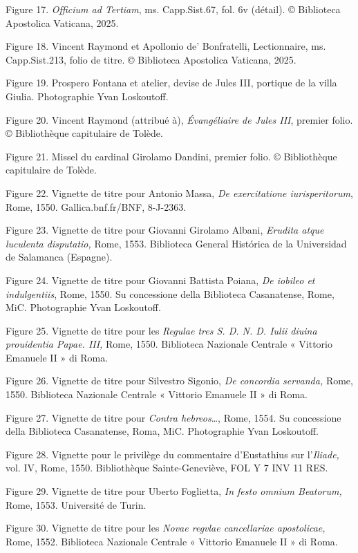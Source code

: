 \documentclass[12pt,twoside,openany]{book}
\begin{document}
Figure 17.\textit{ Officium ad Tertiam}, ms. Capp.Sist.67, fol. 6v (détail). © Biblioteca Apostolica Vaticana, 2025.

Figure 18. Vincent Raymond et Apollonio de’ Bonfratelli, Lectionnaire, ms. Capp.Sist.213, folio de titre. © Biblioteca Apostolica Vaticana, 2025.

Figure 19. Prospero Fontana et atelier, devise de Jules III, portique de la villa Giulia. Photographie Yvan Loskoutoff.

Figure 20. Vincent Raymond (attribué à), \textit{Évangéliaire de Jules III}, premier folio. © Bibliothèque capitulaire de Tolède.

Figure 21. Missel du cardinal Girolamo Dandini, premier folio. © Bibliothèque capitulaire de Tolède.

Figure 22. Vignette de titre pour Antonio Massa,\textit{ De exercitatione iurisperitorum}, Rome, 1550. Gallica.bnf.fr/BNF, 8-J-2363.

Figure 23. Vignette de titre pour Giovanni Girolamo Albani, \textit{Erudita atque luculenta disputatio, }Rome, 1553. Biblioteca General Histórica de la Universidad de Salamanca (Espagne).

Figure 24. Vignette de titre pour Giovanni Battista Poiana, \textit{De iobileo et indulgentiis}, Rome, 1550. Su concessione della Biblioteca Casanatense, Rome, MiC. Photographie Yvan Loskoutoff.

Figure 25. Vignette de titre pour les \textit{Regulae tres S. D. N. D. Iulii diuina prouidentia Papae. III, }Rome, 1550. Biblioteca Nazionale Centrale « Vittorio Emanuele II » di Roma.

Figure 26. Vignette de titre pour Silvestro Sigonio,\textit{ De concordia servanda,} Rome, 1550. Biblioteca Nazionale Centrale « Vittorio Emanuele II » di Roma.

Figure 27. Vignette de titre pour \textit{Contra hebreos}…, Rome, 1554. Su concessione della Biblioteca Casanatense, Roma, MiC. Photographie Yvan Loskoutoff.

Figure 28. Vignette pour le privilège du commentaire d’Eustathius sur l’\textit{Iliade, }vol. IV, Rome, 1550. Bibliothèque Sainte-Geneviève, FOL Y 7 INV 11 RES.

Figure 29. Vignette de titre pour Uberto Foglietta, \textit{In festo omnium Beatorum, }Rome, 1553. Université de Turin.

Figure 30. Vignette de titre pour les \textit{Novae regvlae cancellariae apostolicae, }Rome, 1552. Biblioteca Nazionale Centrale « Vittorio Emanuele II » di Roma.
\end{document}
